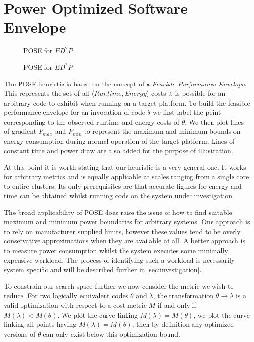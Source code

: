 \section{Power Optimized Software Envelope}
\label{sec:pose}


\begin{figure}
\centering

\caption{POSE for $ED^2P$}
\label{fig:fpe}
\end{figure}



\begin{figure}
\centering

\caption{POSE for $ED^2P$}
\label{fig:technique}
\end{figure}

The POSE heuristic is based on the concept of a \emph{Feasible Performance Envelope}.
This represents the set of all $\langle Runtime, Energy\rangle$ costs it is possible for an arbitrary code to exhibit when running on a target platform.
To build the feasible performance envelope for an invocation of code $\theta$ we first label the point corresponding to the observed runtime and energy costs of $\theta$.
We then plot lines of gradient $P_{max}$ and $P_{min}$ to represent the maximum and minimum bounds on energy consumption during normal operation of the target platform.
Lines of constant time and power draw are also added for the purpose of illustration.

At this point it is worth stating that our heuristic is a very general one.
It works for arbitrary metrics and is equally applicable at scales ranging from a single core to entire clusters.
Its only prerequisites are that accurate figures for energy and time can be obtained whilst running code on the system under investigation.

The broad applicability of POSE does raise the issue of how to find suitable maximum and minimum power boundaries for arbitrary systems. 
One approach is to rely on manufacturer supplied limits, however these values tend to be overly conservative approximations when they are available at all.
A better approach is to measure power consumption whilst the system executes some minimally expensive workload. 
The process of identifying such a workload is necessarily system specific and will be described further in \autoref{sec:investigation}.

To constrain our search space further we now consider the metric we wish to reduce.
For two logically equivalent codes $\theta$ and $\lambda$, the transformation $\theta \to \lambda$ is a valid optimization with respect to a cost metric $M$ if and only if $M(\lambda) < M(\theta)$.
We plot the curve linking $M(\lambda) = M(\theta)$,
 we plot the curve linking all points having $M(\lambda) = M(\theta)$, then by definition any optimized versions of $\theta$ can only exist below this optimization bound.

